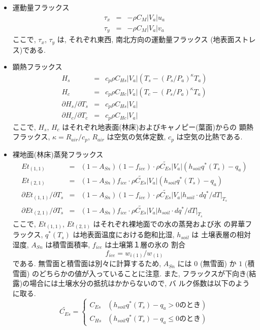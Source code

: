 \begin{itemize}

\item 運動量フラックス
 \begin{eqnarray}
 \tau_x &=& - \rho C_{M}|V_a| u_a \\
 \tau_y &=& - \rho C_{M}|V_a| v_a
 \end{eqnarray}
ここで, $\tau_x$, $\tau_y$ は, それぞれ東西, 南北方向の運動量フラックス
(地表面ストレス)である. 

\item 顕熱フラックス
 \begin{eqnarray}
 H_s &=& c_p \rho C_{Hs}|V_a| (T_s - (P_s/P_a)^{\kappa}T_a)   
 \label{flux_start} \\
 H_c &=& c_p \rho C_{Hc}|V_a| (T_c - (P_s/P_a)^{\kappa}T_a) \\
 \partial H_s/\partial T_s &=& c_p \rho C_{Hs}|V_a| \\
 \partial H_c/\partial T_c &=& c_p \rho C_{Hc}|V_a|
 \end{eqnarray}
ここで, $H_s$, $H_c$ はそれぞれ地表面(林床)およびキャノピー(葉面)からの
顕熱フラックス, $\kappa = R_{air} / c_p$, $R_{air}$ は空気の気体定数,
$c_p$ は空気の比熱である. 

\item 裸地面(林床)蒸発フラックス
 \begin{eqnarray}
 Et_{(1,1)} &=& (1-A_{Sn})(1-f_{ice})\cdot
           \rho \widetilde{C_{Es}}|V_a|(h_{soil}q^*(T_s) - q_a) \\
 Et_{(2,1)} &=& (1-A_{Sn})f_{ice}\cdot
           \rho \widetilde{C_{Es}}|V_a|(h_{soil}q^*(T_s) - q_a) \\
 \partial Et_{(1,1)}/\partial T_s &=& (1-A_{Sn})(1-f_{ice})\cdot
           \rho \widetilde{C_{Es}}|V_a|h_{soil}\cdot dq^*/dT |_{T_s} \\
 \partial Et_{(2,1)}/\partial T_s &=& (1-A_{Sn})f_{ice}\cdot
           \rho \widetilde{C_{Es}}|V_a|h_{soil}\cdot dq^*/dT |_{T_s}
 \end{eqnarray}
ここで, $Et_{(1,1)}$, $Et_{(2,1)}$ はそれぞれ裸地面での水の蒸発および氷
の昇華フラックス, $q^*(T_s)$ は地表面温度における飽和比湿, $h_{soil}$ は
土壌表層の相対湿度, $A_{Sn}$ は積雪面積率, $f_{ice}$ は土壌第１層の氷の
割合
 \begin{equation}
  f_{ice} = w_{i(1)}/w_{(1)}
 \end{equation}
である. 
無雪面と積雪面は別々に計算するため, $A_{Sn}$ には $0$ (無雪面) か $1$
(積雪面) のどちらかの値が入っていることに注意. 
また, フラックスが下向き(結露)の場合には土壌水分の抵抗はかからないので, バ
ルク係数は以下のように取る. 
 \begin{equation}
  \widetilde{C_{Es}} = \left\{
  \begin{array}{ll}
   C_{Es}& (h_{soil}q^*(T_s) - q_a > 0 \mbox{のとき})\\
   C_{Hs}& (h_{soil}q^*(T_s) - q_a \leq 0 \mbox{のとき})
  \end{array}
  \right.
 \end{equation}


\end{itemize}
